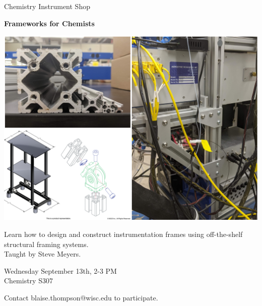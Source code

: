 \documentclass{article}
\begin{document}
\center

\Huge

Chemistry Instrument Shop

\textbf{
Frameworks for Chemists
}

\includegraphics[width=\linewidth]{coverart.png}

{
\huge
Learn how to design and construct instrumentation frames using off-the-shelf structural framing systems. \\
Taught by Steve Meyers.
}

\vfill

{
\huge
Wednesday September 13th, 2-3 PM \\
Chemistry S307
}

\vfill

{
\huge
Contact blaise.thompson@wisc.edu to participate.
}
\end{document}
